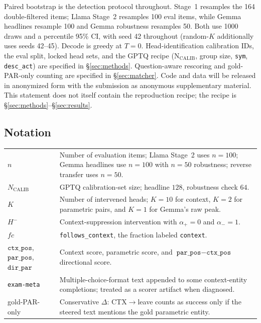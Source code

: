 \documentclass{article} %
\begin{document}
Paired bootstrap is the detection protocol throughout. Stage~1 resamples the 164 double-filtered items; Llama Stage~2 resamples 100 eval items, while Gemma headlines resample 100 and Gemma robustness resamples 50. Both use 1000 draws and a percentile 95\% CI, with seed 42 throughout (random-$K$ additionally uses seeds 42--45). Decode is greedy at $T{=}0$. Head-identification calibration IDs, the eval split, locked head sets, and the GPTQ recipe ($\mathrm{N_{CALIB}}$, group size, \texttt{sym}, \texttt{desc\_act}) are specified in \S\ref{sec:methods}. Question-aware rescoring and gold-PAR-only counting are specified in \S\ref{sec:matcher}. Code and data will be released in anonymized form with the submission as anonymous supplementary material. This statement does not itself contain the reproduction recipe; the recipe is \S\ref{sec:methods}--\S\ref{sec:results}.

\subsection*{Notation}
\begin{center}
\footnotesize
\begin{tabular}{p{0.95in}p{4.2in}}
\toprule
$n$ & Number of evaluation items; Llama Stage~2 uses $n{=}100$; Gemma headlines use $n{=}100$ with $n{=}50$ robustness; reverse transfer uses $n{=}50$. \\
$N_{\mathrm{CALIB}}$ & GPTQ calibration-set size; headline $128$, robustness check $64$. \\
$K$ & Number of intervened heads; $K{=}10$ for context, $K{=}2$ for parametric pairs, and $K{=}1$ for Gemma's raw peak. \\
$H^{-}$ & Context-suppression intervention with $\alpha_{+}{=}0$ and $\alpha_{-}{=}1$. \\
$fc$ & \texttt{follows\_context}, the fraction labeled \texttt{context}. \\
$\texttt{ctx\_pos}$, $\texttt{par\_pos}$, $\texttt{dir\_par}$ & Context score, parametric score, and $\texttt{par\_pos}-\texttt{ctx\_pos}$ directional score. \\
\texttt{exam-meta} & Multiple-choice-format text appended to some context-entity completions; treated as a scorer artifact when diagnosed. \\
gold-PAR-only & Conservative $\Delta$: CTX$\to$leave counts as success only if the steered text mentions the gold parametric entity. \\
\bottomrule
\end{tabular}
\end{center}
\end{document}
